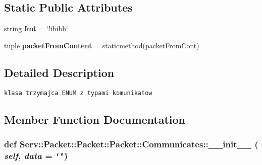 \subsection*{Static Public Attributes}
\begin{CompactItemize}
\item 
\hypertarget{class_serv_1_1_packet_1_1_packet_1_1_communicates_a6c72d5100aa9f954def5f03d4fb7652}{
string \textbf{fmt} = \char`\"{}!ibibh\char`\"{}}
\label{class_serv_1_1_packet_1_1_packet_1_1_communicates_a6c72d5100aa9f954def5f03d4fb7652}

\item 
\hypertarget{class_serv_1_1_packet_1_1_packet_1_1_communicates_66f41044c1723c98c98da5c65bb9dd85}{
tuple \textbf{packetFromContent} = staticmethod(packetFromCont)}
\label{class_serv_1_1_packet_1_1_packet_1_1_communicates_66f41044c1723c98c98da5c65bb9dd85}

\end{CompactItemize}


\subsection{Detailed Description}


\footnotesize\begin{verbatim}
klasa trzymajca ENUM z typami komunikatow

\end{verbatim}
\normalsize
 

\subsection{Member Function Documentation}
\hypertarget{class_serv_1_1_packet_1_1_packet_1_1_communicates_66ff7f1e5bb2594020af9e531007ce07}{
\subsubsection[{\_\-\_\-init\_\-\_\-}]{\setlength{\rightskip}{0pt plus 5cm}def Serv::Packet::Packet::Packet::Communicates::\_\-\_\-init\_\-\_\- ( {\em self}, \/   {\em data} = {\tt \char`\"{}\char`\"{}})}}
\label{class_serv_1_1_packet_1_1_packet_1_1_communicates_66ff7f1e5bb2594020af9e531007ce07}




